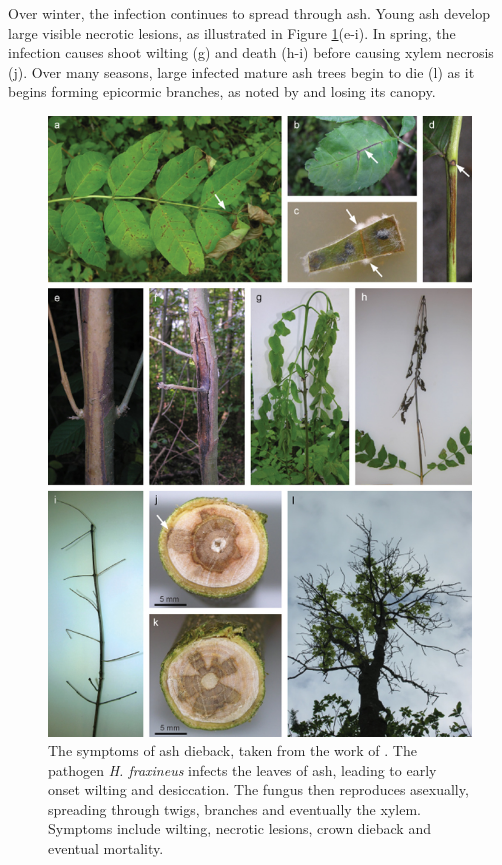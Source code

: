 Over winter, the infection continues to spread through ash. 
Young ash develop large visible necrotic lesions, as illustrated in Figure \ref{fig:ash-deiback-symptoms}(e-i).
In spring, the infection causes shoot wilting (g) and death (h-i) before causing xylem necrosis (j).
Over many seasons, large infected mature ash trees begin to die (l) as it begins forming epicormic branches, 
as noted by \cite{marciulyniene2017can} and losing its canopy.

\begin{figure}
    \centering
    \includegraphics[scale=0.5]{chapter2/figures/gross2014.jpg}
    \caption{
    The symptoms of ash dieback, taken from the work of \cite{gross2014h}. 
    The pathogen \textit{H. fraxineus} infects the leaves of ash, leading to early onset wilting and desiccation. 
    The fungus then reproduces asexually, spreading through twigs, branches and eventually the xylem. 
    Symptoms include wilting, necrotic lesions, crown dieback and eventual mortality.}
    \label{fig:ash-deiback-symptoms}
\end{figure}

